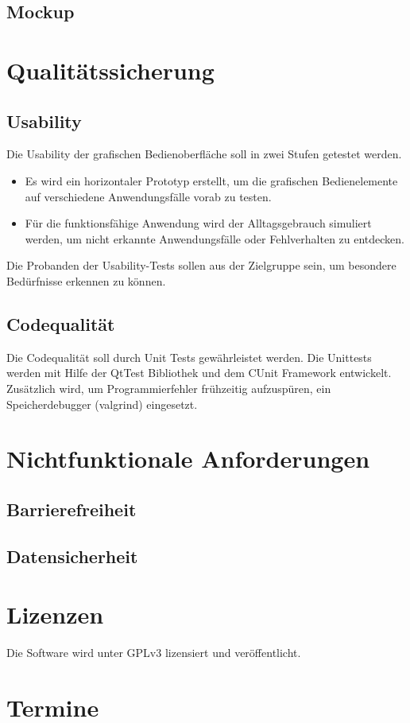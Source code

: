 \documentclass[a4paper,10pt]{article}
\begin{document}
\subsection{Mockup}

\section{Qualitätssicherung}
\subsection{Usability}
Die Usability der grafischen Bedienoberfläche soll in zwei Stufen getestet werden.
\begin{itemize}
\item Es wird ein horizontaler Prototyp erstellt,  um die grafischen Bedienelemente auf verschiedene Anwendungsfälle vorab zu testen. 
\item Für die funktionsfähige Anwendung wird der Alltagsgebrauch simuliert werden, um nicht erkannte Anwendungsfälle oder Fehlverhalten zu entdecken.
\end{itemize}
Die Probanden der Usability-Tests sollen aus der Zielgruppe sein, um besondere Bedürfnisse erkennen zu können.    
\subsection{Codequalität}
Die Codequalität soll durch Unit Tests gewährleistet werden.
Die Unittests werden mit Hilfe der QtTest Bibliothek und dem CUnit Framework entwickelt.
Zusätzlich wird, um Programmierfehler frühzeitig aufzuspüren, ein Speicherdebugger (valgrind) eingesetzt.

\section{Nichtfunktionale Anforderungen}
\subsection{Barrierefreiheit}
\subsection{Datensicherheit}

\section{Lizenzen}
Die Software wird unter GPLv3 lizensiert und veröffentlicht.
\section{Termine}
\end{document}
